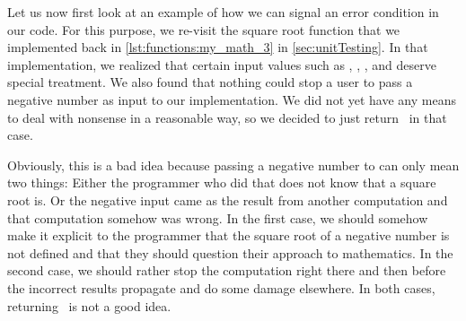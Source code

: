 %
%
%
\endhsection%
%
%
%
%
%
%
%
Let us now first look at an example of how we can signal an error condition in our code.
For this purpose, we re-visit the square root function that  we implemented back in \cref{lst:functions:my_math_3} in \cref{sec:unitTesting}.
In that implementation, we realized that certain input values such as , , , and  deserve special treatment.
We also found that nothing could stop a user to pass a negative number as input to our  implementation.
We did not yet have any means to deal with nonsense in a reasonable way, so we decided to just return~ in that case.

Obviously, this is a bad idea because passing a negative number to  can only mean two things:
Either the programmer who did that does not know that a square root is.
Or the negative input came as the result from another computation and that computation somehow was wrong.
In the first case, we should somehow make it explicit to the programmer that the square root of a negative number is not defined and that they should question their approach to mathematics.
In the second case, we should rather stop the computation right there and then before the incorrect results propagate and do some damage elsewhere.
In both cases, returning~ is not a good idea.

